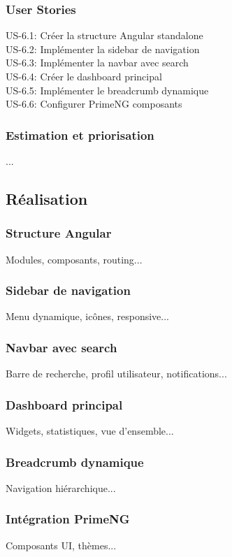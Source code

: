 \documentclass[12pt,a4paper]{report}
\begin{document}
\subsubsection{User Stories}
US-6.1: Créer la structure Angular standalone \\
US-6.2: Implémenter la sidebar de navigation \\
US-6.3: Implémenter la navbar avec search \\
US-6.4: Créer le dashboard principal \\
US-6.5: Implémenter le breadcrumb dynamique \\
US-6.6: Configurer PrimeNG composants

\subsubsection{Estimation et priorisation}
...

\subsection{Réalisation}
\subsubsection{Structure Angular}
Modules, composants, routing...

\subsubsection{Sidebar de navigation}
Menu dynamique, icônes, responsive...

\subsubsection{Navbar avec search}
Barre de recherche, profil utilisateur, notifications...

\subsubsection{Dashboard principal}
Widgets, statistiques, vue d'ensemble...

\subsubsection{Breadcrumb dynamique}
Navigation hiérarchique...

\subsubsection{Intégration PrimeNG}
Composants UI, thèmes...
\end{document}
